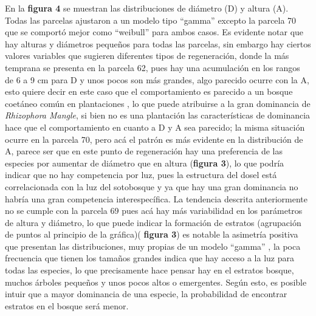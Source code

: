 \documentclass[conference,final,12pt,]{IEEEtran}
\begin{document}
En la \textbf{figura 4} se muestran las distribuciones de diámetro (D) y
altura (A). Todas las parcelas ajustaron a un modelo tipo ``gamma''
excepto la parcela 70 que se comportó mejor como ``weibull'' para ambos
casos. Es evidente notar que hay alturas y diámetros pequeños para todas
las parcelas, sin embargo hay ciertos valores variables que sugieren
diferentes tipos de regeneración, donde la más temprana se presenta en
la parcela 62, pues hay una acumulación en los rangos de 6 a 9 cm para D
y unos pocos son más grandes, algo parecido ocurre con la A, esto quiere
decir en este caso que el comportamiento es parecido a un bosque
coetáneo común en plantaciones \citep{AL}, lo que puede atribuirse a la
gran dominancia de \emph{Rhizophora Mangle}, si bien no es una
plantación las características de dominancia hace que el comportamiento
en cuanto a D y A sea parecido; la misma situación ocurre en la parcela
70, pero acá el patrón es más evidente en la distribución de A, parece
ser que en este punto de regeneración hay una preferencia de las
especies por aumentar de diámetro que en altura (\textbf{figura 3}), lo
que podría indicar que no hay competencia por luz, pues la estructura
del dosel está correlacionada con la luz del sotobosque \citep{AK} y ya
que hay una gran dominancia no habría una gran competencia
interespecífica. La tendencia descrita anteriormente no se cumple con la
parcela 69 pues acá hay más variabilidad en los parámetros de altura y
diámetro, lo que puede indicar la formación de estratos (agrupación de
puntos al principio de la gráfica)( \textbf{figura 3}) es notable la
asimetría positiva que presentan las distribuciones, muy propias de un
modelo ``gamma'' \citep{AJ}, la poca frecuencia que tienen los tamaños
grandes indica que hay acceso a la luz para todas las especies, lo que
precisamente hace pensar hay en el estratos bosque, muchos árboles
pequeños y unos pocos altos o emergentes. Según esto, es posible intuir
que a mayor dominancia de una especie, la probabilidad de encontrar
estratos en el bosque será menor.



\end{document}
